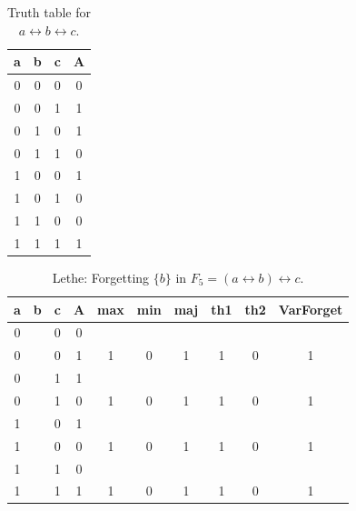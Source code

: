 \begin{table}[!tb]
    \centering
    \begin{tabular}{|c|c|c|c|}
        \hline
        \textbf{a} & \textbf{b} & \textbf{c} & \textbf{A} \\ \hline
        0 & 0 & 0 & 0 \\ \hline
        0 & 0 & 1 & 1 \\ \hline
        0 & 1 & 0 & 1 \\ \hline
        0 & 1 & 1 & 0 \\ \hline
        1 & 0 & 0 & 1 \\ \hline
        1 & 0 & 1 & 0 \\ \hline
        1 & 1 & 0 & 0 \\ \hline
        1 & 1 & 1 & 1 \\ \hline
    \end{tabular}
    \caption{Truth table for $a \leftrightarrow b \leftrightarrow c$.}
    \label{tab:truthtab}
\end{table}

\begin{table}[!tb]
    \centering
    \begin{tabular}{|c|c|c|c|c|c|c|c|c|c|}
        \hline
        \textbf{a} & \textbf{b} & \textbf{c} & \textbf{A} & \textbf{max} & \textbf{min} & \textbf{maj} & \textbf{th1} & \textbf{th2} & \textbf{VarForget} \\ \hline
        \rowcolor{gray!40} 0 &  & 0 & 0 &  &  &  &  &  &  \\ \hline
        \rowcolor{gray!40} 0 &  & 0 & 1 & 1 & 0 & 1 & 1 & 0 & 1 \\ \hline
        \rowcolor{blue!40} 0 &  & 1 & 1 &  &  &  &  &  &  \\ \hline
        \rowcolor{blue!40} 0 &  & 1 & 0 & 1 & 0 & 1 & 1 & 0 & 1 \\ \hline
        \rowcolor{red!40} 1 &  & 0 & 1 &  &  &  &  &  &  \\ \hline
        \rowcolor{red!40} 1 &  & 0 & 0 & 1 & 0 & 1 & 1 & 0 & 1 \\ \hline
        \rowcolor{green!40} 1 &  & 1 & 0 &  &  &  &  &  &  \\ \hline
        \rowcolor{green!40} 1 &  & 1 & 1 & 1 & 0 & 1 & 1 & 0 & 1 \\ \hline
    \end{tabular}
    \caption{Lethe: Forgetting $\{b\}$ in $F_{5} = (a \leftrightarrow b) \leftrightarrow c$.}
    \label{tab:lethe-F5-b}
\end{table}
